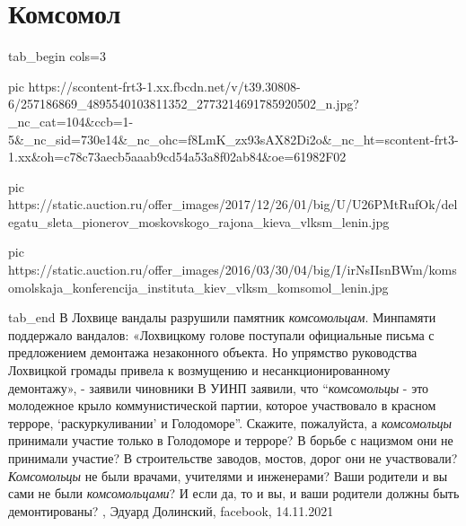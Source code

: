  
 
 
 
 
\chapter{Комсомол}


\ifcmt
  tab_begin cols=3

    pic https://scontent-frt3-1.xx.fbcdn.net/v/t39.30808-6/257186869_4895540103811352_2773214691785920502_n.jpg?_nc_cat=104&ccb=1-5&_nc_sid=730e14&_nc_ohc=f8LmK_zx93sAX82Di2o&_nc_ht=scontent-frt3-1.xx&oh=c78c73aecb5aaab9cd54a53a8f02ab84&oe=61982F02

		pic https://static.auction.ru/offer_images/2017/12/26/01/big/U/U26PMtRufOk/delegatu_sleta_pionerov_moskovskogo_rajona_kieva_vlksm_lenin.jpg

		pic https://static.auction.ru/offer_images/2016/03/30/04/big/I/irNsIIsnBWm/komsomolskaja_konferencija_instituta_kiev_vlksm_komsomol_lenin.jpg

  tab_end
\fi
В Лохвице вандалы разрушили памятник \emph{комсомольцам}. Минпамяти поддержало
вандалов: «Лохвицкому голове поступали официальные письма с предложением
демонтажа незаконного объекта. Но упрямство руководства Лохвицкой громады
привела к возмущению и несанкционированному демонтажу», - заявили чиновники В
УИНП заявили, что \enquote{\emph{комсомольцы} - это молодежное крыло коммунистической
партии, которое участвовало в красном терроре, \enquote{раскуркуливании} и
Голодоморе}.  Скажите, пожалуйста, а \emph{комсомольцы} принимали участие только в
Голодоморе и терроре?  В борьбе с нацизмом они не принимали участие? В
строительстве заводов, мостов, дорог они не участвовали? \emph{Комсомольцы} не были
врачами, учителями и инженерами?  Ваши родители и вы сами не были
\emph{комсомольцами}? И если да, то и вы, и ваши родители должны быть демонтированы?
, Эдуард Долинский, 
facebook, 14.11.2021

